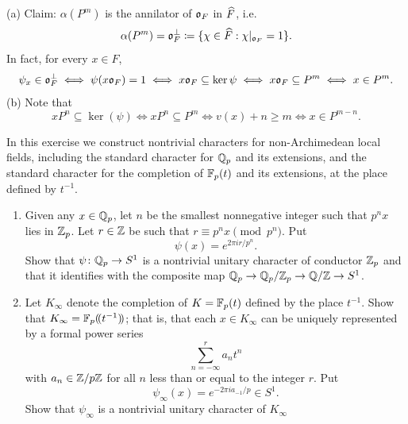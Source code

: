 \begin{solution}
  (a) Claim: $\alpha(P^m)$ is the annilator of $\mathfrak{o}_F$ in $\widehat{F}$, i.e.
    \[\alpha(P^m) = \mathfrak{o}_F^\perp \coloneqq \{\chi \in \widehat{F} : \chi|_{\mathfrak{o}_F} = 1\}. \]
  In fact, for every $x \in F$,
  \[\psi_x \in \mathfrak{o}_F^\perp \iff \psi(x \mathfrak{o}_F) = 1 \iff x\mathfrak{o}_F \subseteq \ker \psi
    \iff x\mathfrak{o}_F \subseteq P^m \iff x \in P^m. \]
  (b) Note that
  \[ xP^n \subseteq \ker (\psi) \iff x P^n \subseteq P ^ m \iff v(x) + n \ge m \iff x \in P^{m - n}. \]
\end{solution}

\begin{exercise}[3]
  \label{ex:ch7-3}
  In this exercise we construct nontrivial characters for non-Archimedean
  local fields, including the standard character for $\mathbb{Q}_p$ and its
  extensions, and the standard character for the completion of $\mathbb{F}_p(t)$ and
  its extensions, at the place defined by $t^{-1}$.
  \begin{enumerate}[label=(\alph*)]
    \item Given any $x \in \mathbb{Q}_p$, let $n$ be the smallest nonnegative integer
      such that $p^n x$ lies in $\mathbb{Z}_p$. Let $r \in \mathbb{Z}$ be such that
      $r \equiv p^n x \pmod{p^n}$. Put
      \[
        \psi(x) = e^{2\pi i r/p^n}.
      \]
      Show that $\psi \colon \mathbb{Q}_p \to S^1$ is a nontrivial unitary character
      of conductor $\mathbb{Z}_p$ and that it identifies with the composite map
      $\mathbb{Q}_p \to \mathbb{Q}_p/\mathbb{Z}_p \to \mathbb{Q}/\mathbb{Z} \to S^1$.
    \item Let $K_\infty$ denote the completion of $K = \mathbb{F}_p(t)$ defined by
      the place $t^{-1}$. Show that $K_\infty = \mathbb{F}_p(\!(t^{-1})\!)$; that is,
      that each $x \in K_\infty$ can be uniquely represented by a formal power
      series
      \[
        \sum_{n=-\infty}^{r} a_n t^n
      \]
      with $a_n \in \mathbb{Z}/p\mathbb{Z}$ for all $n$ less than or equal to the integer
      $r$. Put
      \[
        \psi_\infty(x) = e^{-2\pi i a_{-1}/p} \in S^1.
      \]
      Show that $\psi_\infty$ is a nontrivial unitary character of $K_\infty$

\end{enumerate}
\end{exercise}
